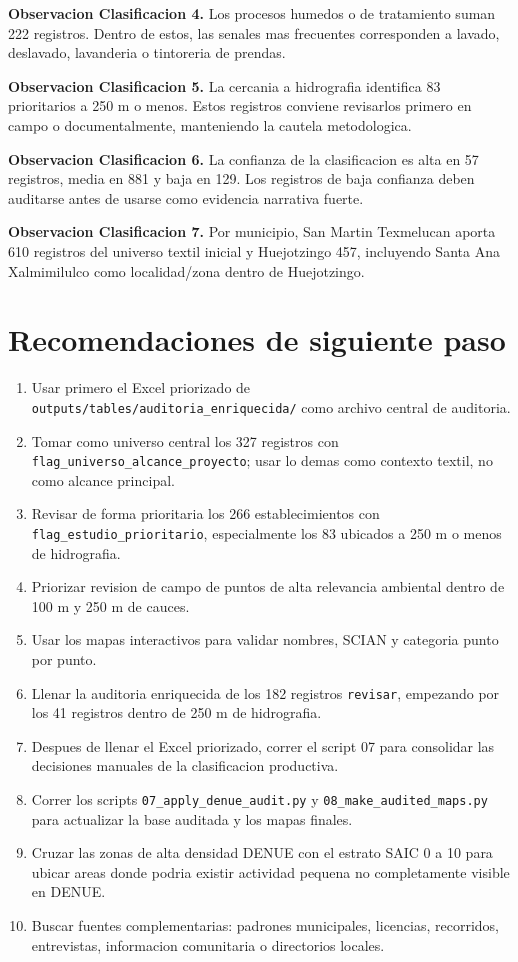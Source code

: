 \documentclass[11pt,letterpaper]{article}
\begin{document}
\textbf{Observacion Clasificacion 4.} Los procesos humedos o de tratamiento suman 222 registros. Dentro de estos, las senales mas frecuentes corresponden a lavado, deslavado, lavanderia o tintoreria de prendas.

\textbf{Observacion Clasificacion 5.} La cercania a hidrografia identifica 83 prioritarios a 250 m o menos. Estos registros conviene revisarlos primero en campo o documentalmente, manteniendo la cautela metodologica.

\textbf{Observacion Clasificacion 6.} La confianza de la clasificacion es alta en 57 registros, media en 881 y baja en 129. Los registros de baja confianza deben auditarse antes de usarse como evidencia narrativa fuerte.

\textbf{Observacion Clasificacion 7.} Por municipio, San Martin Texmelucan aporta 610 registros del universo textil inicial y Huejotzingo 457, incluyendo Santa Ana Xalmimilulco como localidad/zona dentro de Huejotzingo.

\section{Recomendaciones de siguiente paso}

\begin{enumerate}
  \item Usar primero el Excel priorizado de \texttt{outputs/tables/auditoria\_enriquecida/} como archivo central de auditoria.
  \item Tomar como universo central los 327 registros con \texttt{flag\_universo\_alcance\_proyecto}; usar lo demas como contexto textil, no como alcance principal.
  \item Revisar de forma prioritaria los 266 establecimientos con \texttt{flag\_estudio\_prioritario}, especialmente los 83 ubicados a 250 m o menos de hidrografia.
  \item Priorizar revision de campo de puntos de alta relevancia ambiental dentro de 100 m y 250 m de cauces.
  \item Usar los mapas interactivos para validar nombres, SCIAN y categoria punto por punto.
  \item Llenar la auditoria enriquecida de los 182 registros \texttt{revisar}, empezando por los 41 registros dentro de 250 m de hidrografia.
  \item Despues de llenar el Excel priorizado, correr el script 07 para consolidar las decisiones manuales de la clasificacion productiva.
  \item Correr los scripts \texttt{07\_apply\_denue\_audit.py} y \texttt{08\_make\_audited\_maps.py} para actualizar la base auditada y los mapas finales.
  \item Cruzar las zonas de alta densidad DENUE con el estrato SAIC 0 a 10 para ubicar areas donde podria existir actividad pequena no completamente visible en DENUE.
  \item Buscar fuentes complementarias: padrones municipales, licencias, recorridos, entrevistas, informacion comunitaria o directorios locales.
\end{enumerate}
\end{document}
